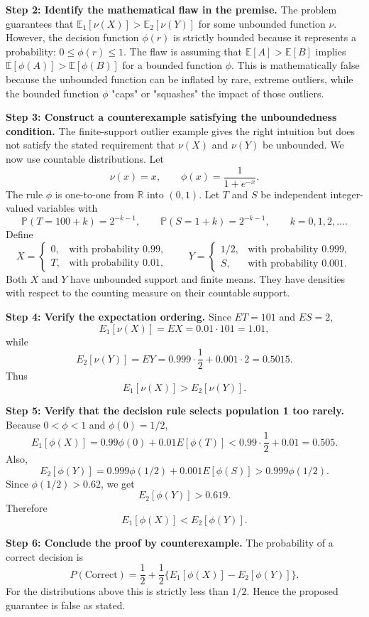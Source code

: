 \begin{solution}
\textbf{Step 2: Identify the mathematical flaw in the premise.}
The problem guarantees that $\mathbb{E}_1[\nu(X)] > \mathbb{E}_2[\nu(Y)]$ for some unbounded function $\nu$.
However, the decision function $\phi(r)$ is strictly bounded because it represents a probability: $0 \leq \phi(r) \leq 1$.
The flaw is assuming that $\mathbb{E}[A] > \mathbb{E}[B]$ implies $\mathbb{E}[\phi(A)] > \mathbb{E}[\phi(B)]$ for a bounded function $\phi$. This is mathematically false because the unbounded function can be inflated by rare, extreme outliers, while the bounded function $\phi$ "caps" or "squashes" the impact of those outliers.

\textbf{Step 3: Construct a counterexample satisfying the unboundedness condition.}
The finite-support outlier example gives the right intuition but does not satisfy the
stated requirement that $\nu(X)$ and $\nu(Y)$ be unbounded. We now use countable
distributions. Let
\[
\nu(x)=x,
\qquad
\phi(x)=\frac{1}{1+e^{-x}}.
\]
The rule $\phi$ is one-to-one from $\mathbb R$ into $(0,1)$. Let $T$ and $S$ be independent
integer-valued variables with
\[
\mathbb P(T=100+k)=2^{-k-1},\qquad
\mathbb P(S=1+k)=2^{-k-1},\qquad k=0,1,2,\ldots.
\]
Define
\[
X=\begin{cases}
0,& \text{with probability }0.99,\\
T,& \text{with probability }0.01,
\end{cases}
\qquad
Y=\begin{cases}
1/2,& \text{with probability }0.999,\\
S,& \text{with probability }0.001.
\end{cases}
\]
Both $X$ and $Y$ have unbounded support and finite means. They have densities with
respect to the counting measure on their countable support.

\textbf{Step 4: Verify the expectation ordering.}
Since $E T=101$ and $E S=2$,
\[
E_1[\nu(X)]=E X=0.01\cdot 101=1.01,
\]
while
\[
E_2[\nu(Y)]=E Y=0.999\cdot \frac12+0.001\cdot 2=0.5015.
\]
Thus
\[
E_1[\nu(X)]>E_2[\nu(Y)].
\]

\textbf{Step 5: Verify that the decision rule selects population 1 too rarely.}
Because $0<\phi<1$ and $\phi(0)=1/2$,
\[
E_1[\phi(X)]
=0.99\phi(0)+0.01E[\phi(T)]
<0.99\cdot \frac12+0.01=0.505.
\]
Also,
\[
E_2[\phi(Y)]
=0.999\phi(1/2)+0.001E[\phi(S)]
>0.999\phi(1/2).
\]
Since $\phi(1/2)>0.62$, we get
\[
E_2[\phi(Y)]>0.619.
\]
Therefore
\[
E_1[\phi(X)]<E_2[\phi(Y)].
\]

\textbf{Step 6: Conclude the proof by counterexample.}
The probability of a correct decision is
\[
P(\text{Correct})
=\frac12+\frac12\{E_1[\phi(X)]-E_2[\phi(Y)]\}.
\]
For the distributions above this is strictly less than $1/2$. Hence the proposed
guarantee is false as stated.
\end{solution}

